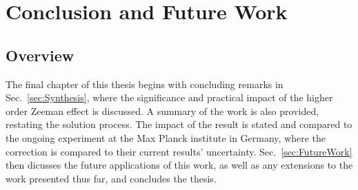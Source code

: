 \chapter{Conclusion and Future Work}\label{sec:Conclusion}
    \section{Overview}
        The final chapter of this thesis begins with concluding remarks in Sec.~\ref{sec:Synthesis}, where the significance and practical impact of the higher order Zeeman effect is discussed. A summary of the work is also provided, restating the solution process. The impact of the result is stated and compared to the ongoing experiment at the Max Planck institute in Germany, where the correction is compared to their current results' uncertainty. Sec.~\ref{sec:FutureWork} then dicusses the future applications of this work, as well as any extensions to the work presented thus far, and concludes the thesis.
